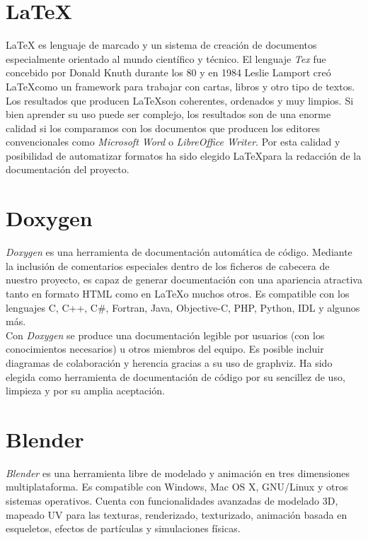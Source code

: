 \section*{LaTeX}

\LaTeX \cite{website:latex-wikibooks} es lenguaje de marcado y un sistema
de creación de documentos especialmente orientado al mundo científico y
técnico. El lenguaje \textit{Tex} fue concebido por Donald Knuth durante
los 80 y en 1984 Leslie Lamport creó \LaTeX como un framework para trabajar
con cartas, libros y otro tipo de textos.\\

Los resultados que producen \LaTeX son coherentes, ordenados y muy limpios.
Si bien aprender su uso puede ser complejo, los resultados son de una
enorme calidad si los comparamos con los documentos que producen los editores
convencionales como \textit{Microsoft Word} o \textit{LibreOffice Writer}.
Por esta calidad y posibilidad de automatizar formatos ha sido elegido
\LaTeX para la redacción de la documentación del proyecto.\\

\section*{Doxygen}

\textit{Doxygen} \cite{website:doxygen} es una herramienta de documentación
automática de código. Mediante la inclusión de comentarios especiales
dentro de los ficheros de cabecera de nuestro proyecto, es capaz
de generar documentación con una apariencia atractiva tanto en formato HTML como
en \LaTeX o muchos otros. Es compatible con los lenguajes C, C++, C\#,
Fortran, Java, Objective-C, PHP, Python, IDL y algunos más.\\

Con \textit{Doxygen} se produce una documentación legible por usuarios (con
los conocimientos necesarios) u otros miembros del equipo. Es posible incluir
diagramas de colaboración y herencia gracias a su uso de graphviz. Ha sido
elegida como herramienta de documentación de código por su sencillez de uso,
limpieza y por su amplia aceptación.\\


\section*{Blender}

\textit{Blender} \cite{hess09} es una herramienta libre de modelado y animación
en tres dimensiones multiplataforma. Es compatible con Windows, Mac OS X,
GNU/Linux y otros sistemas operativos. Cuenta con funcionalidades avanzadas
de modelado 3D, mapeado UV para las texturas, renderizado, texturizado, 
animación basada en esqueletos, efectos de partículas y simulaciones físicas.\\

